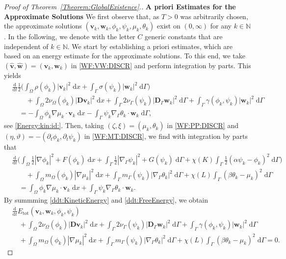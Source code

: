 \documentclass[10pt,reqno]{amsart}
\theoremstyle{remark}
\numberwithin{equation}{section}
\newcommand{\abs}[1]{| #1 |}
\newcommand{\N}{\mathbb N}
\newcommand{\bv}{\mathbf{v}}
\newcommand{\bw}{\mathbf{w}}
\newcommand{\ww}{\widehat{\bw}}
\newcommand{\wv}{\widehat{\bv}}
\newcommand{\D}{\mathbf{D}}
\newcommand{\Dg}{\mathbf{D}_\Gamma}
\newcommand{\intO}{\int_\Omega}
\newcommand{\intG}{\int_\Gamma}
\newcommand{\dx}{\;\mathrm{d}x}
\newcommand{\dG}{\;\mathrm d\Ga}
\newcommand{\ddt}{\frac{\mathrm d}{\mathrm dt}}
\newcommand{\delt}{\partial_{t}}
\newcommand{\Grad}{\nabla}
\newcommand{\Gradg}{\nabla_\Ga}
\newcommand{\Om}{\Omega}
\newcommand{\Ga}{\Gamma}
\begin{document}
\begin{proof}[Proof of Theorem~\ref{Theorem:GlobalExistence}.]
\textbf{A priori Estimates for the Approximate Solutions}
We first observe that, as $T > 0$ was arbitrarily chosen, the approximate solutions $(\bv_k,\bw_k,\phi_k,\psi_k,\mu_k,\theta_k)$ exist on $(0,\infty)$ for any $k\in\N$. In the following, we denote with the letter $C$ generic constants that are independent of $k\in\N$.
We start by establishing a priori estimates, which are based on an energy estimate for the approximate solutions. To this end, we take $(\wv,\ww) = (\bv_k,\bw_k)$ in \eqref{WF:VW:DISCR} and perform integration by parts. This yields
\begin{align}\label{ddt:KineticEnergy}
    &\ddt\frac12\Big(\intO \rho(\phi_k)\abs{\bv_k}^2\dx + \intG \sigma(\psi_k)\abs{\bw_k}^2\dG\Big) \nonumber \\
    &\qquad + \intO 2\nu_\Om(\phi_k)\abs{\D\bv_k}^2\dx + \intG 2\nu_\Ga(\psi_k)\abs{\Dg\bw_k}^2\dG + \intG \gamma(\phi_k,\psi_k)\abs{\bw_k}^2\dG \\
    &\quad = -\intO \phi_k\Grad\mu_k\cdot\bv_k\dx - \intG \psi_k\Gradg\theta_k\cdot\bw_k\dG, \nonumber
\end{align}
see \eqref{Energy:kin:id:}. Then, taking $(\zeta,\xi) = (\mu_k,\theta_k)$ in \eqref{WF:PP:DISCR} and $(\eta,\vartheta) = -(\delt\phi_k,\delt\psi_k)$ in \eqref{WF:MT:DISCR}, we find with integration by parts that
\begin{align}\label{ddt:FreeEnergy}
    &\ddt\Big( \intO \frac12\abs{\Grad\phi_k}^2 + F(\phi_k)\dx + \intG \frac12\abs{\Gradg\psi_k}^2 + G(\psi_k)\dG + \chi(K)\intG \frac12(\alpha\psi_k - \phi_k)^2\dG \Big) \nonumber \\
    &\qquad + \intO m_\Om(\phi_k)\abs{\Grad\mu_k}^2\dx + \intG m_\Ga(\psi_k)\abs{\Gradg\theta_k}^2\dG + \chi(L)\intG (\beta\theta_k - \mu_k)^2\dG \\
    &\quad = \intO \phi_k\Grad\mu_k\cdot\bv_k\dx + \intG \psi_k\Gradg\theta_k\cdot\bw_k. \nonumber  
\end{align}
By summming \eqref{ddt:KineticEnergy} and \eqref{ddt:FreeEnergy}, we obtain
\begin{align*}
    &\ddt E_{\mathrm{tot}}(\bv_k,\bw_k,\phi_k,\psi_k) \\
    &\quad + \intO 2\nu_\Om(\phi_k)\abs{\D\bv_k}^2\dx + \intG 2\nu_\Ga(\psi_k)\abs{\Dg\bw_k}^2\dG + \intG \gamma(\phi_k,\psi_k)\abs{\bw_k}^2\dG \\
    &\quad + \intO m_\Om(\phi_k)\abs{\Grad\mu_k}^2\dx + \intG m_\Ga(\psi_k)\abs{\Gradg\theta_k}^2\dG + \chi(L) \intG (\beta\theta_k - \mu_k)^2\dG = 0.
\end{align*}

\end{proof}
\end{document}

